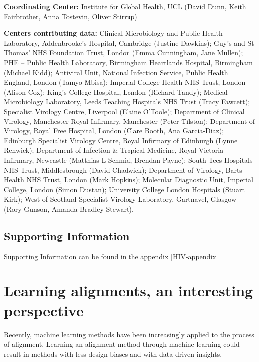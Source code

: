 \documentclass[
  11pt,
  twoside,
  BCOR=10mm,
  listof=totoc]{scrbook}
\begin{document}
\textbf{Coordinating Center:}
Institute for Global Health, UCL (David Dunn, Keith Fairbrother,
Anna Tostevin, Oliver Stirrup)

\textbf{Centers contributing data:}
Clinical Microbiology and Public Health Laboratory, Addenbrooke's
Hospital, Cambridge (Justine Dawkins); Guy's and St Thomas' NHS
Foundation Trust, London (Emma Cunningham, Jane Mullen); PHE --
Public Health Laboratory, Birmingham Heartlands Hospital, Birmingham
(Michael Kidd); Antiviral Unit, National Infection Service, Public
Health England, London (Tamyo Mbisa); Imperial College Health NHS
Trust, London (Alison Cox); King's College Hospital, London (Richard
Tandy); Medical Microbiology Laboratory, Leeds Teaching Hospitals
NHS Trust (Tracy Fawcett); Specialist Virology Centre, Liverpool
(Elaine O'Toole); Department of Clinical Virology, Manchester Royal
Infirmary, Manchester (Peter Tilston); Department of Virology, Royal
Free Hospital, London (Clare Booth, Ana Garcia-Diaz); Edinburgh
Specialist Virology Centre, Royal Infirmary of Edinburgh (Lynne
Renwick); Department of Infection \& Tropical Medicine, Royal
Victoria Infirmary, Newcastle (Matthias L Schmid, Brendan Payne);
South Tees Hospitals NHS Trust, Middlesbrough (David Chadwick);
Department of Virology, Barts Health NHS Trust, London (Mark
Hopkins); Molecular Diagnostic Unit, Imperial College, London (Simon
Dustan); University College London Hospitals (Stuart Kirk); West of
Scotland Specialist Virology Laboratory, Gartnavel, Glasgow (Rory
Gunson, Amanda Bradley-Stewart).

\hypertarget{supporting-information}{%
\section*{Supporting Information}\label{supporting-information}}

Supporting Information can be found in the appendix \ref{HIV-appendix}

\printbibliography[segment=\therefsegment,heading=subbibintoc,title={References for chapter \thechapter}]

\hypertarget{learning-alignments-an-interesting-perspective}{%
\chapter{Learning alignments, an interesting perspective}\label{learning-alignments-an-interesting-perspective}}

Recently, machine learning methods have been increasingly applied to the process of alignment. Learning an alignment method through machine learning could result in methods with less design biases and with data-driven insights.
\end{document}
